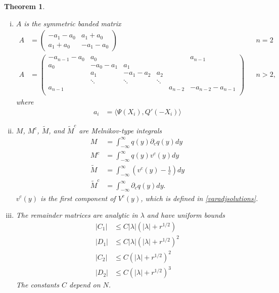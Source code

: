 \documentclass[11pt,reqno]{amsart}
\theoremstyle{plain}
\newtheorem{theorem}{Theorem}
\theoremstyle{definition}
\theoremstyle{remark}
\begin{document}
\begin{theorem}
\begin{enumerate}[(i)]
\item $A$ is the symmetric banded matrix
\begin{equation}\label{Asymm}
\begin{aligned}
A &= \begin{pmatrix}
-a_1 - a_0 & a_1 + a_0 \\
a_1 + a_0 & - a_1 - a_0 
\end{pmatrix} && n = 2 \\
A &= \begin{pmatrix}
-a_{n-1} - a_0 & a_0 & & &  & a_{n-1}\\
a_0 & -a_0 - a_1 &  a_1 \\
& a_1 & -a_1 - a_2 &  a_2 \\
& \ddots & \ddots & \ddots \\
a_{n-1} & & & & a_{n-2} & -a_{n-2} - a_{n-1} \\
\end{pmatrix} && n > 2,
\end{aligned}
\end{equation}
where
\begin{align*}
a_i &= \langle \Psi(X_i), Q'(-X_i) \rangle
\end{align*}

\item $M$, $M^c$, $\tilde{M}$, and $\tilde{M}^c$ are  Melnikov-type integrals
\begin{align*}
M &= \int_{-\infty}^\infty q(y) \partial_c q(y) dy \\
M^c &= \int_{-\infty}^\infty q(y) v^c(y) dy \\
\tilde{M} &= \int_{-\infty}^{\infty} \left(v^c(y) - \frac{1}{c}\right) dy \\
\tilde{M}^c &= \int_{-\infty}^\infty \partial_c q(y) dy .
\end{align*}
$v^c(y)$ is the first component of $V^c(y)$, which is defined in \cref{varadjsolutions}.

\item The remainder matrices are analytic in $\lambda$ and have uniform bounds
\begin{align*}
|C_1| &\leq C |\lambda|(|\lambda| + r^{1/2}) \\
|D_1| &\leq C |\lambda|(|\lambda| + r^{1/2})^2 \\
|C_2| &\leq C (|\lambda| + r^{1/2})^2 \\
|D_2| &\leq C (|\lambda| + r^{1/2})^3 
\end{align*}
The constants $C$ depend on $N$.
\end{enumerate}
\end{theorem}
\end{document}
